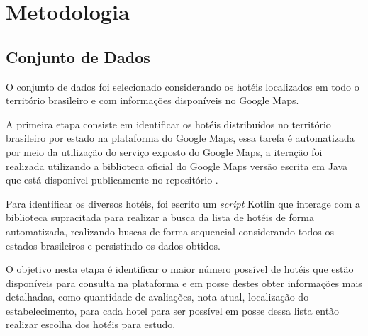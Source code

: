\chapter{Metodologia}
\label{cap:metodologia}


\section{Conjunto de Dados}
\label{cap:metodologia:sec:conjunto_dados}


O conjunto de dados foi selecionado considerando os hotéis localizados em todo o território brasileiro e com informações disponíveis no Google Maps.

A primeira etapa consiste em identificar os hotéis distribuídos no território brasileiro por estado na plataforma do Google Maps, essa tarefa é automatizada por meio da utilização do serviço exposto do Google Maps, a iteração foi realizada utilizando a biblioteca oficial do Google Maps versão escrita em Java que está disponível publicamente no repositório .

Para identificar os diversos hotéis, foi escrito um \emph{script} Kotlin  que interage com a biblioteca supracitada para realizar a busca da lista de hotéis de forma automatizada, realizando buscas de forma sequencial considerando todos os estados brasileiros e persistindo os dados obtidos.

O objetivo nesta etapa é identificar o maior número possível de hotéis que estão disponíveis para consulta na plataforma e em posse destes obter informações mais detalhadas, como quantidade de avaliações, nota atual, localização do estabelecimento, para cada hotel para ser possível em posse dessa lista então realizar escolha dos hotéis para estudo.

